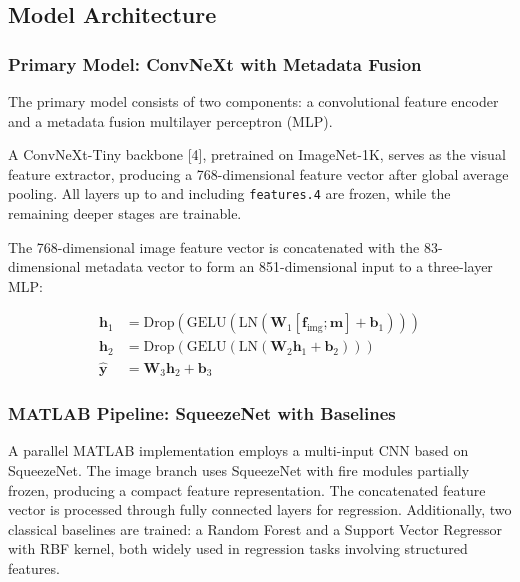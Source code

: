 \documentclass[9pt, a4paper, twocolumn]{article}
\begin{document}
\subsection{Model Architecture}

\subsubsection{Primary Model: ConvNeXt with Metadata Fusion}

The primary model consists of two components: a convolutional feature encoder and a metadata fusion multilayer perceptron (MLP).

A ConvNeXt-Tiny backbone [4], pretrained on ImageNet-1K, serves as the visual feature extractor, producing a 768-dimensional feature vector after global average pooling. All layers up to and including \texttt{features.4} are frozen, while the remaining deeper stages are trainable.

The 768-dimensional image feature vector is concatenated with the 83-dimensional metadata vector to form an 851-dimensional input to a three-layer MLP:

\begin{equation}
\begin{aligned}
\mathbf{h}_1 &= \text{Drop}\!\left(\text{GELU}\!\left(
    \text{LN}\!\left(\mathbf{W}_1 [\mathbf{f}_{\text{img}};
    \mathbf{m}] + \mathbf{b}_1\right)\right)\right) \\
\mathbf{h}_2 &= \text{Drop}\!\left(\text{GELU}\!\left(
    \text{LN}\!\left(\mathbf{W}_2 \mathbf{h}_1 +
    \mathbf{b}_2\right)\right)\right) \\
\hat{\mathbf{y}} &= \mathbf{W}_3 \mathbf{h}_2 + \mathbf{b}_3
\end{aligned}
\end{equation}

\subsubsection{MATLAB Pipeline: SqueezeNet with Baselines}

A parallel MATLAB implementation employs a multi-input CNN based on SqueezeNet. The image branch uses SqueezeNet with fire modules partially frozen, producing a compact feature representation. The concatenated feature vector is processed through fully connected layers for regression. Additionally, two classical baselines are trained: a Random Forest and a Support Vector Regressor with RBF kernel, both widely used in regression tasks involving structured features.
\end{document}
